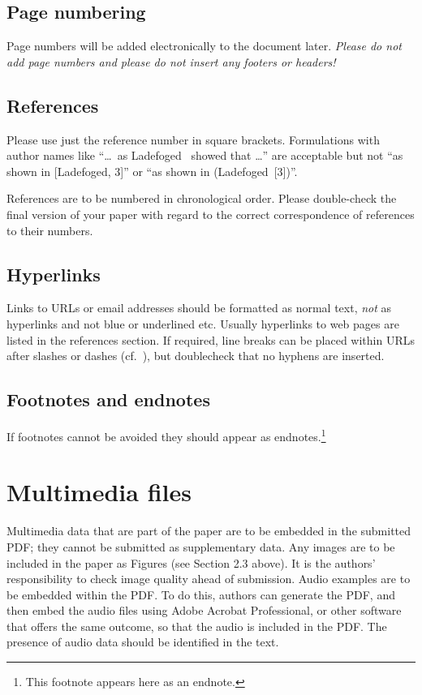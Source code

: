 \documentclass[a4paper,11pt,twocolumn]{article}
\begin{document}
\subsection{Page numbering}

Page numbers will be added electronically to the document
later. \textit{Please do not add page numbers and please do not insert
any footers or headers!}

\subsection{References}

Please use just the reference number in square brackets. Formulations
with author names like ``\ldots\ as Ladefoged~\cite{Ladefoged:2003}
showed that \ldots'' are acceptable but not ``as shown in [Ladefoged,
3]'' or ``as shown in (Ladefoged~[3])''.

References are to be numbered in chronological order. Please
double-check the final version of your paper with regard to the
correct correspondence of references to their numbers.

\subsection{Hyperlinks}

Links to URLs or email addresses should be formatted as normal text,
\textit{not} as hyperlinks and not blue or underlined etc. Usually
hyperlinks to web pages are listed in the references section. If
required, line breaks can be placed within URLs after slashes or
dashes (cf.~\cite{IPA-SIL,IPA-KEYBOARD}), but doublecheck that no hyphens
are inserted.

\subsection{Footnotes and endnotes}

If footnotes cannot be avoided they should appear as
endnotes.\footnote{This footnote appears here as an endnote.}

\section{Multimedia files}

Multimedia data that are part of the paper are to be embedded in the submitted PDF; they cannot be submitted as supplementary data. Any images are to be included in the paper as Figures (see Section 2.3 above). It is the authors' responsibility to check image quality ahead of submission. Audio examples are to be embedded within the PDF. To do this, authors can generate the PDF, and then embed the audio files using Adobe Acrobat Professional, or other software that offers the same outcome, so that the audio is included in the PDF. The presence of audio data should be identified in the text.
\end{document}

